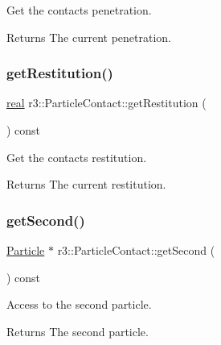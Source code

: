 Get the contact\textquotesingle{}s penetration. 

\begin{DoxyReturn}{Returns}
The current penetration. 
\end{DoxyReturn}
\mbox{\label{classr3_1_1_particle_contact_a89c8382938e10cff1846085f16e8b4a2}} 
\subsubsection{\texorpdfstring{get\+Restitution()}{getRestitution()}}
{\footnotesize\ttfamily \mbox{\hyperlink{namespacer3_ab2016b3e3f743fb735afce242f0dc1eb}{real}} r3\+::\+Particle\+Contact\+::get\+Restitution (\begin{DoxyParamCaption}{ }\end{DoxyParamCaption}) const}



Get the contact\textquotesingle{}s restitution. 

\begin{DoxyReturn}{Returns}
The current restitution. 
\end{DoxyReturn}
\mbox{\label{classr3_1_1_particle_contact_ad2002c182f5a4716a35dd0110af7c476}} 
\subsubsection{\texorpdfstring{get\+Second()}{getSecond()}}
{\footnotesize\ttfamily \mbox{\hyperlink{classr3_1_1_particle}{Particle}} $\ast$ r3\+::\+Particle\+Contact\+::get\+Second (\begin{DoxyParamCaption}{ }\end{DoxyParamCaption}) const}



Access to the second particle. 

\begin{DoxyReturn}{Returns}
The second particle. 
\end{DoxyReturn}
\mbox{\label{classr3_1_1_particle_contact_a1132e11eab7f76f783a6d4c8e0e63303}} 
